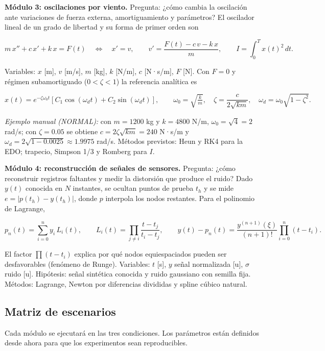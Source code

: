 \documentclass[
  11pt,
  letterpaper,
]{article}
\begin{document}
\textbf{Módulo 3: oscilaciones por viento.} Pregunta: ¿cómo cambia la
oscilación ante variaciones de fuerza externa, amortiguamiento y
parámetros? El oscilador lineal de un grado de libertad y su forma de
primer orden son

\[m\,x''+c\,x'+k\,x=F(t)\quad\Longleftrightarrow\quad x'=v,\qquad v'=\frac{F(t)-c\,v-k\,x}{m},\qquad I=\int_0^{T}x(t)^{2}\,dt .\]

Variables: \(x\) {[}m{]}, \(v\) {[}m/s{]}, \(m\) {[}kg{]}, \(k\)
{[}N/m{]}, \(c\) {[}N·s/m{]}, \(F\) {[}N{]}. Con \(F=0\) y régimen
subamortiguado (\(0<\zeta<1\)) la referencia analítica es

\[x(t)=e^{-\zeta\omega_0 t}\left[C_1\cos(\omega_d t)+C_2\sin(\omega_d t)\right],\qquad \omega_0=\sqrt{\tfrac{k}{m}},\quad \zeta=\frac{c}{2\sqrt{km}},\quad \omega_d=\omega_0\sqrt{1-\zeta^{2}} .\]

\emph{Ejemplo manual (NORMAL):} con \(m=1200\) kg y \(k=4800\) N/m,
\(\omega_0=\sqrt{4}=2\) rad/s; con \(\zeta=0.05\) se obtiene
\(c=2\zeta\sqrt{km}=240\) N·s/m y
\(\omega_d=2\sqrt{1-0.0025}\approx 1.9975\) rad/s. Métodos previstos:
Heun y RK4 para la EDO; trapecio, Simpson 1/3 y Romberg para \(I\).

\textbf{Módulo 4: reconstrucción de señales de sensores.} Pregunta:
¿cómo reconstruir registros faltantes y medir la distorsión que produce
el ruido? Dado \(y(t)\) conocida en \(N\) instantes, se ocultan puntos
de prueba \(t_h\) y se mide \(e=|p(t_h)-y(t_h)|\), donde \(p\) interpola
los nodos restantes. Para el polinomio de Lagrange,

\[p_n(t)=\sum_{i=0}^{n}y_i\,L_i(t),\qquad L_i(t)=\prod_{j\neq i}\frac{t-t_j}{t_i-t_j},\qquad y(t)-p_n(t)=\frac{y^{(n+1)}(\xi)}{(n+1)!}\prod_{i=0}^{n}(t-t_i).\]

El factor \(\prod(t-t_i)\) explica por qué nodos equiespaciados pueden
ser desfavorables (fenómeno de Runge). Variables: \(t\) {[}s{]}, \(y\)
señal normalizada {[}u{]}, \(\sigma\) ruido {[}u{]}. Hipótesis: señal
sintética conocida y ruido gaussiano con semilla fija. Métodos:
Lagrange, Newton por diferencias divididas y spline cúbico natural.

\hypertarget{escenarios}{%
\subsection{Matriz de escenarios}\label{escenarios}}

Cada módulo se ejecutará en las tres condiciones. Los parámetros están
definidos desde ahora para que los experimentos sean reproducibles.
\end{document}
